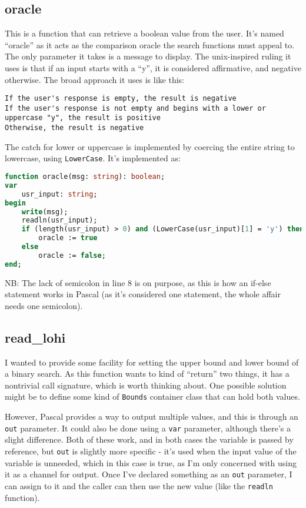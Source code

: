 \documentclass{article}
\begin{document}
    \subsection{oracle}
    This is a function that can retrieve a boolean value from the user. It's
    named ``oracle'' as it acts as the comparison oracle the search functions
    must appeal to. The only parameter it takes is a message to display. The
    unix-inspired ruling it uses is that if an input starts with a ``y'', it is
    considered affirmative, and negative otherwise. The broad approach it uses
    is like this:

\begin{lstlisting}[caption=oracle pseudocode]
If the user's response is empty, the result is negative
If the user's response is not empty and begins with a lower or uppercase "y", the result is positive
Otherwise, the result is negative
\end{lstlisting}

    The catch for lower or uppercase is implemented by coercing the entire
    string to lowercase, using \verb|LowerCase|. It's implemented as:

\begin{lstlisting}[language=Pascal, caption=oracle implementation]
function oracle(msg: string): boolean;
var
    usr_input: string;
begin
    write(msg);
    readln(usr_input);
    if (length(usr_input) > 0) and (LowerCase(usr_input)[1] = 'y') then
        oracle := true
    else
        oracle := false;
end;
\end{lstlisting}

    NB: The lack of semicolon in line 8 is on purpose, as this is how an
    if-else statement works in Pascal (as it's considered one statement, the
    whole affair needs one semicolon).

    \subsection{read\_lohi}
    I wanted to provide some facility for setting the upper bound and lower
    bound of a binary search. As this function wants to kind of ``return'' two
    things, it has a nontrivial call signature, which is worth thinking about.
    One possible solution might be to define some kind of \verb|Bounds|
    container class that can hold both values.
    
    However, Pascal provides a way to output multiple values, and this is
    through an \verb|out| parameter. It could also be done using a \verb|var|
    parameter, although there's a slight difference. Both of these work, and in
    both cases the variable is passed by reference, but \verb|out| is slightly
    more specific - it's used when the input value of the variable is unneeded,
    which in this case is true, as I'm only concerned with using it as a channel
    for output. Once I've declared something as an \verb|out| parameter, I can
    assign to it and the caller can then use the new value (like the
    \verb|readln| function).
\end{document}
